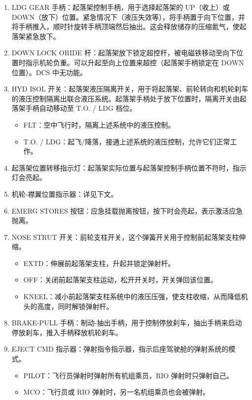 \begin{enumerate}
	\item LDG GEAR 手柄：起落架控制手柄，用于选择起落架的 UP（收上）或 DOWN（放下）位置。紧急情况下（液压失效等），将手柄置于向下位置，并将手柄推入，顺时针旋转手柄顶端然后抽出。这会释放储存的压缩氮气，使起落架紧急放下。
	\item DOWN LOCK ORIDE 杆：起落架放下锁定超控杆，被电磁铁移动至向下位置时指示机轮负重。可以升起至向上位置来超控（起落架手柄锁定在 DOWN 位置）。DCS 中无功能。
	\item HYD ISOL 开关：起落架液压隔离开关，用于将起落架、前轮转向和机轮刹车的液压控制隔离出联合液压系统。起落架手柄处于放下位置时，隔离开关由起落架手柄自动移动至 T.O. / LDG 档位。
	      \begin{itemize}
		      \item FLT：空中飞行时，隔离上述系统中的液压控制。
		      \item T.O. / LDG：起飞/降落，接通上述系统的液压控制，允许它们正常工作。
	      \end{itemize}
	\item 起落架位置转移指示灯：起落架实际位置与起落架控制手柄位置不符时，指示灯会亮起。
	\item 机轮-襟翼位置指示器：详见下文。
	\item EMERG STORES 按钮：应急挂载抛离按钮，按下时会亮起，表示激活应急抛离。
	\item NOSE STRUT 开关：前轮支柱开关，这个弹簧开关用于控制前起落架支柱伸缩。
	      \begin{itemize}
		      \item EXTD：伸展前起落架支柱，升起并锁定弹射杆。
		      \item OFF：关闭前起落架支柱运动，松开开关时，开关弹回该位置。
		      \item KNEEL：减小前起落架支柱系统中的液压压强，使支柱收缩，从而降低机头的高度，同时解锁弹射杆。
	      \end{itemize}
	\item BRAKE-PULL 手柄：制动-抽出手柄，用于控制停放刹车，抽出手柄来启动停放刹车，推入手柄释放机轮刹车。
	\item EJECT CMD 指示器：弹射指令指示器，指示后座驾驶舱的弹射系统的模式。
	      \begin{itemize}
		      \item PILOT：飞行员弹射时弹射所有机组乘员，RIO 弹射时只弹射自己。
		      \item MCO：飞行员或 RIO 弹射时，另一名机组乘员也会被弹射。
	      \end{itemize}
\end{enumerate}

